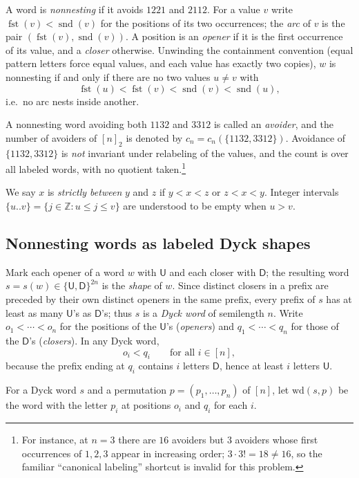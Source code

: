 \documentclass[11pt]{article}
\theoremstyle{definition}
\theoremstyle{remark}
\newcommand{\nn}{[n]_2}
\DeclareMathOperator{\fst}{fst}
\DeclareMathOperator{\snd}{snd}
\newcommand{\sU}{\mathsf{U}}
\newcommand{\sD}{\mathsf{D}}
\begin{document}
A word is \emph{nonnesting} if it avoids $1221$ and $2112$. For a value $v$
write $\fst(v)<\snd(v)$ for the positions of its two occurrences; the
\emph{arc} of $v$ is the pair $(\fst(v),\snd(v))$. A position is an
\emph{opener} if it is the first occurrence of its value, and a
\emph{closer} otherwise. Unwinding the containment convention (equal pattern
letters force equal values, and each value has exactly two copies), $w$ is
nonnesting if and only if there are no two values $u\neq v$ with
\[
  \fst(u)<\fst(v)<\snd(v)<\snd(u),
\]
i.e.\ no arc nests inside another.

A nonnesting word avoiding both $1132$ and $3312$ is called an
\emph{avoider}, and the number of avoiders of $\nn$ is denoted by
$c_n=c_n(\{1132,3312\})$.
Avoidance of $\{1132,3312\}$ is \emph{not} invariant under relabeling of the
values, and the count is over all labeled words, with no quotient
taken.\footnote{For instance, at $n=3$ there are $16$ avoiders but $3$
avoiders whose first occurrences of $1,2,3$ appear in increasing order;
$3\cdot 3!=18\neq 16$, so the familiar ``canonical labeling'' shortcut is
invalid for this problem.}

We say $x$ is \emph{strictly between} $y$ and $z$ if $y<x<z$ or $z<x<y$.
Integer intervals $\{u..v\}=\{j\in\mathbb Z: u\le j\le v\}$ are understood to
be empty when $u>v$.

\subsection{Nonnesting words as labeled Dyck shapes}

Mark each opener of a word $w$ with $\sU$ and each closer with $\sD$; the
resulting word $s=s(w)\in\{\sU,\sD\}^{2n}$ is the \emph{shape} of $w$. Since
distinct closers in a prefix are preceded by their own distinct openers in
the same prefix, every prefix of $s$ has at least as many $\sU$'s as
$\sD$'s; thus $s$ is a \emph{Dyck word} of semilength $n$. Write
$o_1<\cdots<o_n$ for the positions of the $\sU$'s (\emph{openers}) and
$q_1<\cdots<q_n$ for those of the $\sD$'s (\emph{closers}). In any Dyck word,
\begin{equation}\label{eq:oq}
  o_i<q_i \qquad\text{for all } i\in[n],
\end{equation}
because the prefix ending at $q_i$ contains $i$ letters $\sD$, hence at
least $i$ letters $\sU$.

For a Dyck word $s$ and a permutation $p=(p_1,\dots,p_n)$ of $[n]$, let
$\mathrm{wd}(s,p)$ be the word with the letter $p_i$ at positions $o_i$ and
$q_i$ for each $i$.
\end{document}

